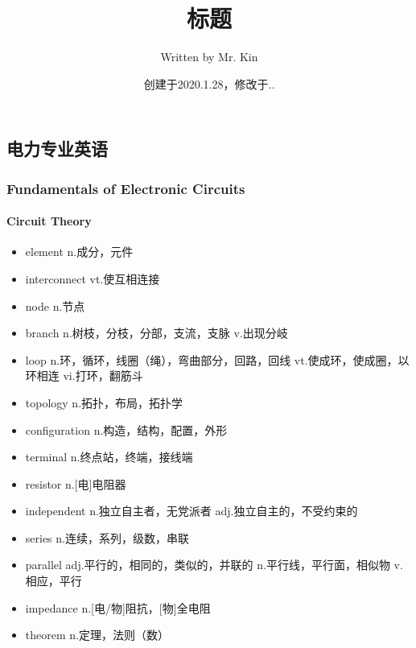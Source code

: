 \documentclass[11pt,a4paper,UTF8,titlepage]{ctexart} %
\title{\hypertarget{title}{\textbf{标题}}}
\author{Written by Mr. Kin}
\date{创建于2020.1.28，修改于\number\year.\number\month.\number\day}
\makeatletter
\renewcommand{\tableofcontents}%
  {\chapter{\contentsname}%
  \@mkboth{\MakeUppercase\contentsname}{\MakeUppercase\contentsname}%
  \@makeschapterhead{\sourcecodename}%
  \@starttoc{toc}%
}
\makeatother
\begin{document}
    \maketitle %
    {\centering \tableofcontents} %
    \clearpage %
    \fi

    \section{电力专业英语}
    \subsection{Fundamentals of Electronic Circuits}
    \subsubsection{Circuit Theory}
    \begin{multicols}{2}
        \begin{itemize}
            \item element n.成分，元件
            \item interconnect vt.使互相连接
            \item node n.节点
            \item branch n.树枝，分枝，分部，支流，支脉 v.出现分岐
            \item loop n.环，循环，线圈（绳），弯曲部分，回路，回线 vt.使成环，使成圈，以环相连 vi.打环，翻筋斗
            \item topology n.拓扑，布局，拓扑学
            \item configuration n.构造，结构，配置，外形
            \item terminal n.终点站，终端，接线端
            \item resistor n.[电]电阻器
            \item independent n.独立自主者，无党派者 adj.独立自主的，不受约束的
            \item series n.连续，系列，级数，串联
            \item parallel adj.平行的，相同的，类似的，并联的 n.平行线，平行面，相似物 v.相应，平行
            \item impedance n.[电/物]阻抗，[物]全电阻
            \item theorem n.定理，法则（数）
        \end{itemize}
    \end{multicols}
\end{document}
